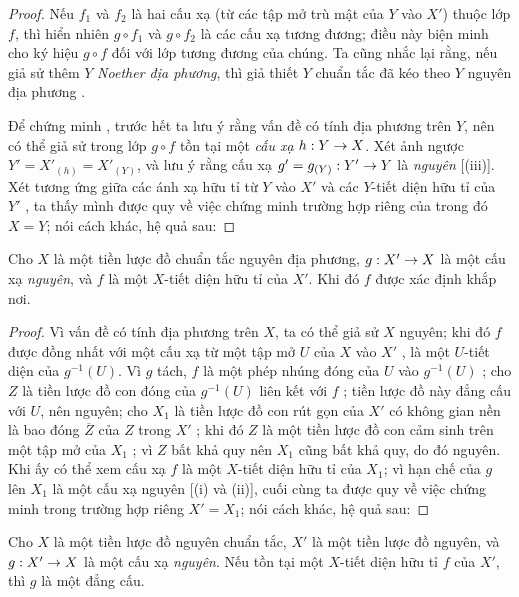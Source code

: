 \documentclass[oneside,10pt]{amsart}
\makeatletter
\newcommand{\ega@arrow}[2]{\mathchoice{#1}{#2}{#2}{#2}}
\renewcommand{\to}{\ega@arrow{\longrightarrow}{\rightarrow}}
\let\EGAOriginalLabel\label
\renewcommand{\label}[1]{\phantomsection\EGAOriginalLabel{#1}}
\makeatother
\begin{document}
\begin{proof}
Nếu $f_1$ và $f_2$ là hai cấu xạ (từ các tập mở trù mật của $Y$ vào $X'$) thuộc lớp $f$, thì hiển nhiên $g\circ f_1$ và $g\circ f_2$ là các cấu xạ tương đương; điều này biện minh cho ký hiệu $g\circ f$ đối với lớp tương đương của chúng.
Ta cũng nhắc lại rằng, nếu giả sử thêm $Y$ \emph{Noether địa phương}, thì giả thiết $Y$ chuẩn tắc đã kéo theo $Y$ nguyên địa phương .

Để chứng minh , trước hết ta lưu ý rằng vấn đề có tính địa phương trên $Y$, nên có thể giả sử trong lớp $g\circ f$ tồn tại một \emph{cấu xạ} $h:Y\to X$.
Xét ảnh ngược $Y'=X'_{(h)}=X'_{(Y)}$, và lưu ý rằng cấu xạ $g'=g_{(Y)}:Y'\to Y$ là \emph{nguyên} [(iii)].
Xét tương ứng giữa các ánh xạ hữu tỉ từ $Y$ vào $X'$ và các $Y$-tiết diện hữu tỉ của $Y'$ , ta thấy mình được quy về việc chứng minh trường hợp riêng của  trong đó $X=Y$; nói cách khác, hệ quả sau:
\end{proof}

\begin{corollary}[6.1.14]
\label{II.6.1.14}
Cho $X$ là một tiền lược đồ chuẩn tắc nguyên địa phương, $g:X'\to X$ là một cấu xạ \emph{nguyên}, và $f$ là một $X$-tiết diện hữu tỉ của $X'$.
Khi đó $f$ được xác định khắp nơi.
\end{corollary}

\begin{proof}
Vì vấn đề có tính địa phương trên $X$, ta có thể giả sử $X$ nguyên; khi đó $f$ được đồng nhất với một cấu xạ từ một tập mở $U$ của $X$ vào $X'$ , là một $U$-tiết diện của $g^{-1}(U)$.
Vì $g$ tách, $f$ là một phép nhúng đóng của $U$ vào $g^{-1}(U)$ ;
cho $Z$ là tiền lược đồ con đóng của $g^{-1}(U)$ liên kết với $f$ ; tiền lược đồ này đẳng cấu với $U$, nên nguyên;
cho $X_1$ là tiền lược đồ con rút gọn của $X'$ có không gian nền là bao đóng $\overline{Z}$ của $Z$ trong $X'$ ;
khi đó $Z$ là một tiền lược đồ con cảm sinh trên một tập mở của $X_1$ ; vì $Z$ bất khả quy nên $X_1$ cũng bất khả quy, do đó nguyên.
Khi ấy có thể xem cấu xạ $f$ là một $X$-tiết diện hữu tỉ của $X_1$;
vì hạn chế của $g$ lên $X_1$ là một cấu xạ nguyên [(i) và (ii)], cuối cùng ta được quy về việc chứng minh  trong trường hợp riêng $X'=X_1$; nói cách khác, hệ quả sau:
\end{proof}

\begin{corollary}[6.1.15]
\label{II.6.1.15}
Cho $X$ là một tiền lược đồ nguyên chuẩn tắc, $X'$ là một tiền lược đồ nguyên, và $g:X'\to X$ là một cấu xạ \emph{nguyên}.
Nếu tồn tại một $X$-tiết diện hữu tỉ $f$ của $X'$, thì $g$ là một đẳng cấu.
\end{corollary}
\end{document}
